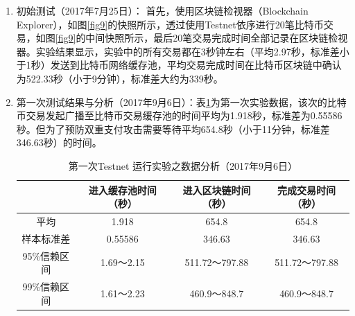 		\begin{enumerate}
			\item 初始测试（2017年7月25日）：
			首先，使用区块链检视器（Blockchain Explorer）\supercite{Blockchainexplorer:Ananalyticalprocessandinvestigationenvironmentforbitcoin}，如图\ref{fig9}的快照所示，透过使用Testnet依序进行20笔比特币交易，如图\ref{fig9}的中间快照所示，最后20笔交易完成时间全部记录在区块链检视器。实验结果显示，实验中的所有交易都在3秒钟左右（平均2.97秒，标准差小于1秒）发送到比特币网络缓存池，平均交易完成时间在比特币区块链中确认为522.33秒（小于9分钟），标准差大约为339秒。

			\item 第一次测试结果与分析（2017年9月6日）：表\ref{1general}为第一次实验数据，该次的比特币交易发起广播至比特币交易缓存池的时间平均为1.918秒，标准差为0.55586秒。但为了预防双重支付攻击需要等待平均654.8秒（小于11分钟，标准差346.63秒）的时间。

				\begin{table}[!htbp]
				\centering
				\caption{第一次Testnet 运行实验之数据分析（2017年9月6日）}
				\label{1general}
				\begin{tabular}{|c|c|c|c|}
				\hline
				         & 进入缓存池时间（秒） & 进入区块链时间（秒）    & 完成交易时间（秒）     \\ \hline
				平均       & 1.918      & 654.8         & 654.8         \\ \hline
				样本标准差    & 0.55586    & 346.63        & 346.63        \\ \hline
				95\%信赖区间 & 1.69～2.15  & 511.72～797.88 & 511.72～797.88 \\ \hline
				99\%信赖区间 & 1.61～2.23  & 460.9～848.7   & 460.9～848.7   \\ \hline
				\end{tabular}
				\end{table}


\end{enumerate}
